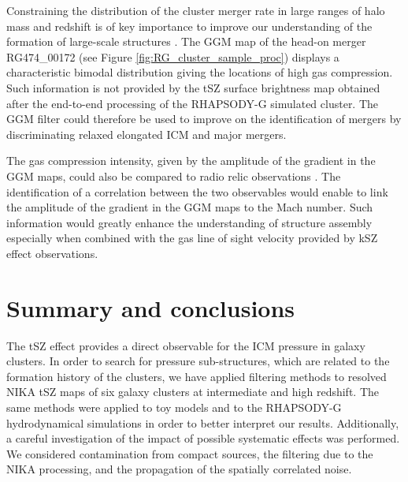 \documentclass[twocolumn,traditabstract]{aa}
\begin{document}
Constraining the distribution of the cluster merger rate in large ranges of halo mass and redshift is of key importance to improve our understanding of the formation of large-scale structures \citep[e.g.][]{Fakhouri2010}. The GGM map of the head-on merger RG474\_00172 (see Figure \ref{fig:RG_cluster_sample_proc}) displays a characteristic bimodal distribution giving the locations of high gas compression. Such information is not provided by the tSZ surface brightness map obtained after the end-to-end processing of the RHAPSODY-G simulated cluster. The GGM filter could therefore be used to improve on the identification of mergers by discriminating relaxed elongated ICM and major mergers. 

The gas compression intensity, given by the amplitude of the gradient in the GGM maps, could also be compared to radio relic observations \citep[e.g.][]{vanWeeren2010}. The identification of a correlation between the two observables would enable to link the amplitude of the gradient in the GGM maps to the Mach number. Such information would greatly enhance the understanding of structure assembly especially when combined with the gas line of sight velocity provided by kSZ effect observations.

\section{Summary and conclusions}\label{sec:Summary_and_conclusions}
The tSZ effect provides a direct observable for the ICM pressure in galaxy clusters. In order to search for pressure sub-structures, which are related to the formation history of the clusters, we have applied filtering methods to resolved NIKA tSZ maps of six galaxy clusters at intermediate and high redshift. The same methods were applied to toy models and to the RHAPSODY-G hydrodynamical simulations in order to better interpret our results. Additionally, a careful investigation of the impact of possible systematic effects was performed. We considered contamination from compact sources, the filtering due to the NIKA processing, and the propagation of the spatially correlated noise.
\end{document}
